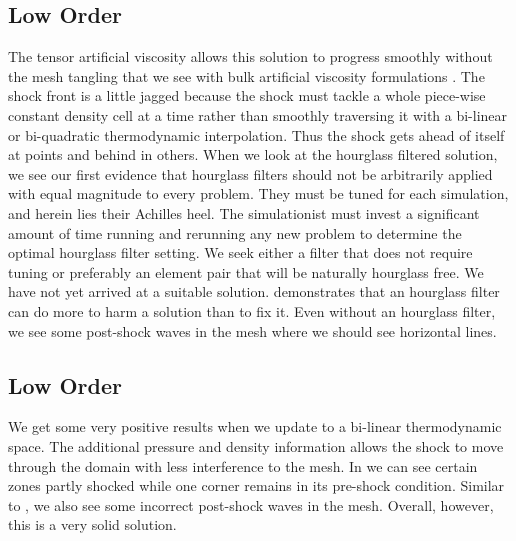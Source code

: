 \subsection{Low Order \texorpdfstring{}{Q1-Q0}}
The tensor artificial viscosity allows this solution to progress smoothly without the mesh tangling that we see with bulk artificial viscosity formulations \cite{Barlow07}. The shock front is a little jagged because the shock must tackle a whole piece-wise constant density cell at a time rather than smoothly traversing it with a bi-linear or bi-quadratic thermodynamic interpolation. Thus the shock gets ahead of itself at points and behind in others. When we look at the hourglass filtered solution, we see our first evidence that hourglass filters should not be arbitrarily applied with equal magnitude to every problem. They must be tuned for each simulation, and herein lies their Achilles heel. The simulationist must invest a significant amount of time running and rerunning any new problem to determine the optimal hourglass filter setting. We seek either a filter that does not require tuning or preferably an element pair that will be naturally hourglass free. We have not yet arrived at a suitable solution.  demonstrates that an hourglass filter can do more to harm a solution than to fix it. Even without an hourglass filter, we see some post-shock waves in the mesh where we should see horizontal lines.


\subsection{Low Order \texorpdfstring{}{Q1-Q1}}
We get some very positive results when we update to a bi-linear thermodynamic space. The additional pressure and density information allows the shock to move through the domain with less interference to the mesh. In  we can see certain zones partly shocked while one corner remains in its pre-shock condition. Similar to , we also see some incorrect post-shock waves in the mesh. Overall, however, this is a very solid solution.


